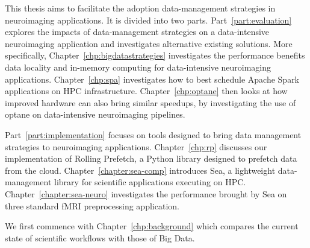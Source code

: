 	This thesis aims to facilitate the adoption data-management strategies in neuroimaging applications. 
        It is divided into two parts.
        Part~\ref{part:evaluation} explores the impacts of data-management strategies
        on a data-intensive neuroimaging application
        and investigates alternative existing solutions. More specifically,
        Chapter~\ref{chp:bigdatastrategies} investigates the performance
        benefits data locality and in-memory computing for data-intensive
        neuroimaging applications. Chapter~\ref{chp:spa} investigates how to
        best schedule Apache Spark applications on HPC infrastructure.
        Chapter~\ref{chp:optane} then looks at how improved hardware can also
        bring similar speedups, by investigating the use of \gls{optane} on data-intensive neuroimaging pipelines.

        Part~\ref{part:implementation} focuses on tools designed to bring
        data management strategies to neuroimaging applications. Chapter~\ref{chp:rp}
        discusses our implementation of Rolling Prefetch, a Python library designed to
        \gls{prefetch} data from the cloud. Chapter~\ref{chapter:sea-comp} introduces Sea, a lightweight 
        data-management library for scientific applications executing on HPC. Chapter~\ref{chapter:sea-neuro}
        investigates the performance brought by Sea on three standard fMRI preprocessing application.

        We first commence with Chapter~\ref{chp:background} which compares the current state of scientific workflows
        with those of Big Data.


